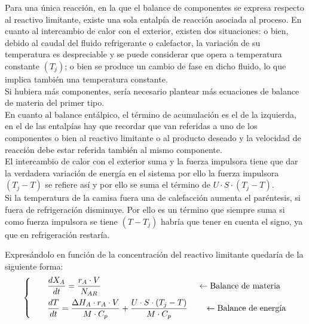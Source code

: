 Para una única reacción, en la que el balance de componentes se expresa respecto al reactivo limitante, existe una sola entalpía de reacción asociada al proceso.
En cuanto al intercambio de calor con el exterior, existen dos situaciones: o bien, debido al caudal del fluido refrigerante o calefactor, la variación de su temperatura es despreciable y se puede considerar que opera a temperatura constante $(T_j)$;
o bien se produce un cambio de fase en dicho fluido, lo que implica también una temperatura constante.\\

Si hubiera más componentes, sería necesario plantear más ecuaciones de balance de materia del primer tipo.\\
\vspace{1em}
En cuanto al balance entálpico, el término de acumulación es el de la izquierda, en el de las entalpías hay que recordar que van referidas a uno de los componentes o bien al reactivo limitante o al producto deseado y la velocidad de reacción debe estar referida también al mismo componente.\\
\vspace{1em}
El intercambio de calor con el exterior suma y la fuerza impulsora tiene que dar la verdadera variación de energía en el sistema por ello la fuerza impulsora $(T_j-T)$ se refiere así y por ello se suma el término de $U\cdot S\cdot(T_j-T)$.\\
\vspace{1em}
Si la temperatura de la camisa fuera una de calefacción aumenta el paréntesis, si fuera de refrigeración disminuye. Por ello es un término que siempre suma si como fuerza impulsora se tiene $(T-T_j)$ habría que tener en cuenta el signo, ya que en refrigeración restaría.

Expresándolo en función de la concentración del reactivo limitante quedaría de la siguiente forma:\\

\begin{equation}
    \left\{
    \begin{aligned}
         & \hspace{2em}\frac{dX_A}{dt}                   = \frac{r_A \cdot V}{N_{AR}}       \hspace{11.5em}\leftarrow \text{Balance de materia}                                            \\
         & \hspace{2em}\frac{dT}{dt}  = \frac{\Delta H_A \cdot r_A \cdot V }{M \cdot C_p} + \frac{U \cdot S \cdot (T_j - T)}{M \cdot C_p} \hspace{2em}\leftarrow \text{Balance de energía}
    \end{aligned}
    \right.
\end{equation}

